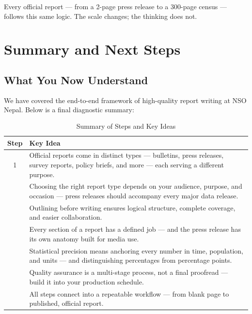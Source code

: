 \documentclass[11pt,a4paper,oneside]{book}
\begin{document}
Every official report --- from a 2-page press release to a 300-page census --- follows this same logic. The scale changes; the thinking does not.


\chapter{Summary and Next Steps}

\section{What You Now Understand}

We have covered the end-to-end framework of high-quality report writing at NSO Nepal. Below is a final diagnostic summary:

\begin{table}[htbp]
\centering
\caption{Summary of Steps and Key Ideas}
\label{tab:final_summary}
\vspace{0.3cm}
\begin{tabularx}{\textwidth}{c X}
\toprule
\textbf{Step} & \textbf{Key Idea} \\
\midrule
1 & Official reports come in distinct types --- bulletins, press releases, survey reports, policy briefs, and more --- each serving a different purpose. \\
\addlinespace
2 & Choosing the right report type depends on your audience, purpose, and occasion --- press releases should accompany every major data release. \\
\addlinespace
3 & Outlining before writing ensures logical structure, complete coverage, and easier collaboration. \\
\addlinespace
4 & Every section of a report has a defined job --- and the press release has its own anatomy built for media use. \\
\addlinespace
5 & Statistical precision means anchoring every number in time, population, and units --- and distinguishing percentages from percentage points. \\
\addlinespace
6 & Quality assurance is a multi-stage process, not a final proofread --- build it into your production schedule. \\
\addlinespace
7 & All steps connect into a repeatable workflow --- from blank page to published, official report. \\
\bottomrule
\end{tabularx}
\end{table}
\end{document}
